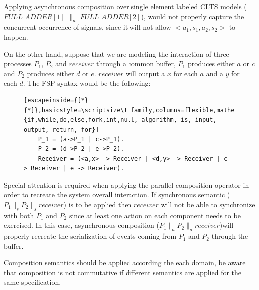 Applying asynchronous composition over single element labeled CLTS models ($FULL\_ADDER[1]$ $\parallel_{a}$ $FULL\_ADDER[2]$), would not properly capture the concurrent occurrence of signals, since it will not allow $<a_1,s_1,a_2,s_2>$ to happen.  

On the other hand, suppose that we are modeling the interaction of three processes $P_1$, $P_2$ and $receiver$ through a common buffer, $P_1$ produces either $a$ or $c$ and
$P_2$ produces either $d$ or $e$. $receiver$ will output a $x$ for each $a$ and a $y$ for each $d$. The FSP syntax would be the following:

\renewcommand{\ttdefault}{pcr}
\begin{figure}[H]
	\begin{lstlisting}[escapeinside={[*}{*]},basicstyle=\scriptsize\ttfamily,columns=flexible,mathescape=true,xleftmargin=3.0ex,keywordstyle=\textbf,morekeywords={if,while,do,else,fork,int,null, algorithm, is, input, output, return, for}]
	P_1 = (a->P_1 | c->P_1).
	P_2 = (d->P_2 | e->P_2).
	Receiver = (<a,x> -> Receiver | <d,y> -> Receiver | c -> Receiver | e -> Receiver).
	\end{lstlisting}
	\label{fig:receiver_fsp}
	\MediumPicture
\end{figure}

Special attention is required when applying the parallel composition operator in order to recreate the system overall interaction. If synchronous semantic ($P_1\parallel_s P_2 \parallel_s receiver$) is to be applied then $receiver$ will not be able to synchronize with both $P_1$ and $P_2$ since at least one action on each component needs to be exercised. In this case, asynchronous composition ($P_1\parallel_a P_2 \parallel_a receiver$)will properly recreate the serialization of events coming from $P_1$ and $P_2$ through the buffer.

Composition semantics should be applied according the each domain, be aware that composition is not commutative if different semantics are applied for the same specification.

%
%

